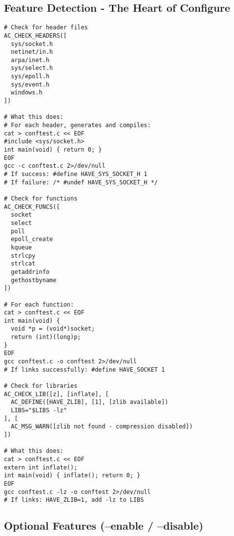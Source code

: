 \subsection{Feature Detection - The Heart of Configure}

\begin{lstlisting}
# Check for header files
AC_CHECK_HEADERS([
  sys/socket.h
  netinet/in.h
  arpa/inet.h
  sys/select.h
  sys/epoll.h
  sys/event.h
  windows.h
])

# What this does:
# For each header, generates and compiles:
cat > conftest.c << EOF
#include <sys/socket.h>
int main(void) { return 0; }
EOF
gcc -c conftest.c 2>/dev/null
# If success: #define HAVE_SYS_SOCKET_H 1
# If failure: /* #undef HAVE_SYS_SOCKET_H */

# Check for functions
AC_CHECK_FUNCS([
  socket
  select
  poll
  epoll_create
  kqueue
  strlcpy
  strlcat
  getaddrinfo
  gethostbyname
])

# For each function:
cat > conftest.c << EOF
int main(void) {
  void *p = (void*)socket;
  return (int)(long)p;
}
EOF
gcc conftest.c -o conftest 2>/dev/null
# If links successfully: #define HAVE_SOCKET 1

# Check for libraries
AC_CHECK_LIB([z], [inflate], [
  AC_DEFINE([HAVE_ZLIB], [1], [zlib available])
  LIBS="$LIBS -lz"
], [
  AC_MSG_WARN([zlib not found - compression disabled])
])

# What this does:
cat > conftest.c << EOF
extern int inflate();
int main(void) { inflate(); return 0; }
EOF
gcc conftest.c -lz -o conftest 2>/dev/null
# If links: HAVE_ZLIB=1, add -lz to LIBS
\end{lstlisting}

\subsection{Optional Features (--enable / --disable)}

